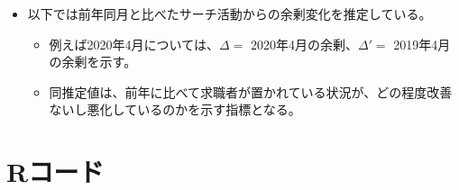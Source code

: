 \documentclass[
]{book}
\begin{document}
\begin{itemize}
\item
  以下では前年同月と比べたサーチ活動からの余剰変化を推定している。

  \begin{itemize}
  \item
    例えば2020年4月については、\(\Delta=\) 2020年4月の余剰、\(\Delta'=\) 2019年4月の余剰を示す。
  \item
    同推定値は、前年に比べて求職者が置かれている状況が、どの程度改善ないし悪化しているのかを示す指標となる。
  \end{itemize}
\end{itemize}

\hypertarget{rux30b3ux30fcux30c9-1}{%
\section{Rコード}\label{rux30b3ux30fcux30c9-1}}
\end{document}
